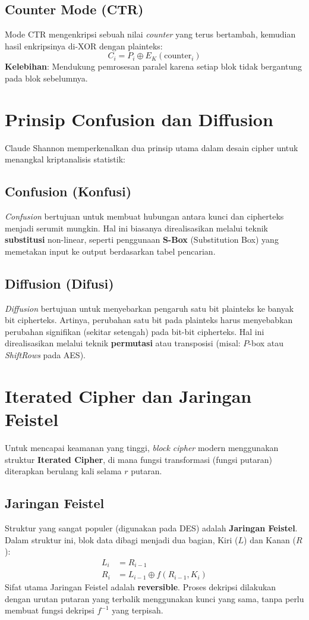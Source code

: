 \documentclass[../main.tex]{subfiles}
\begin{document}
\subsection{Counter Mode (CTR)}
Mode CTR mengenkripsi sebuah nilai \textit{counter} yang terus bertambah, kemudian hasil enkripsinya di-XOR dengan plainteks:
\[ C_i = P_i \oplus E_K(\text{counter}_i) \]
\textbf{Kelebihan}: Mendukung pemrosesan paralel karena setiap blok tidak bergantung pada blok sebelumnya.

\section{Prinsip Confusion dan Diffusion}
Claude Shannon memperkenalkan dua prinsip utama dalam desain cipher untuk menangkal kriptanalisis statistik:

\subsection{Confusion (Konfusi)}
\textit{Confusion} bertujuan untuk membuat hubungan antara kunci dan cipherteks menjadi serumit mungkin. Hal ini biasanya direalisasikan melalui teknik \textbf{substitusi} non-linear, seperti penggunaan \textbf{S-Box} (Substitution Box) yang memetakan input ke output berdasarkan tabel pencarian.

\subsection{Diffusion (Difusi)}
\textit{Diffusion} bertujuan untuk menyebarkan pengaruh satu bit plainteks ke banyak bit cipherteks. Artinya, perubahan satu bit pada plainteks harus menyebabkan perubahan signifikan (sekitar setengah) pada bit-bit cipherteks. Hal ini direalisasikan melalui teknik \textbf{permutasi} atau transposisi (misal: $P$-box atau \textit{ShiftRows} pada AES).

\section{Iterated Cipher dan Jaringan Feistel}
Untuk mencapai keamanan yang tinggi, \textit{block cipher} modern menggunakan struktur \textbf{Iterated Cipher}, di mana fungsi transformasi (fungsi putaran) diterapkan berulang kali selama $r$ putaran.

\subsection{Jaringan Feistel}
Struktur yang sangat populer (digunakan pada DES) adalah \textbf{Jaringan Feistel}. Dalam struktur ini, blok data dibagi menjadi dua bagian, Kiri ($L$) dan Kanan ($R$):
\begin{align*}
L_i &= R_{i-1} \\
R_i &= L_{i-1} \oplus f(R_{i-1}, K_i)
\end{align*}
Sifat utama Jaringan Feistel adalah \textbf{reversible}. Proses dekripsi dilakukan dengan urutan putaran yang terbalik menggunakan kunci yang sama, tanpa perlu membuat fungsi dekripsi $f^{-1}$ yang terpisah.
\end{document}
